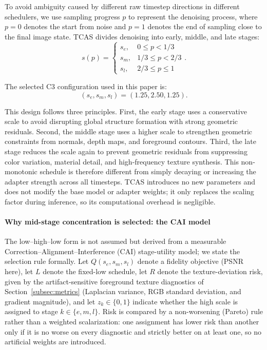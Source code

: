 \documentclass[times,twocolumn,final]{elsarticle}
\begin{document}
To avoid ambiguity caused by different raw timestep directions in different schedulers, we use sampling progress $p$ to represent the denoising process, where $p = 0$ denotes the start from noise and $p = 1$ denotes the end of sampling close to the final image state. TCAS divides denoising into early, middle, and late stages:
\begin{equation}
s(p) = \begin{cases} s_e, & 0 \leq p < 1/3 \\ s_m, & 1/3 \leq p < 2/3 \\ s_l, & 2/3 \leq p \leq 1 \end{cases}.
\label{eq:tcas}
\end{equation}

The selected C3 configuration used in this paper is:
\begin{equation}
(s_e, s_m, s_l) = (1.25, 2.50, 1.25).
\end{equation}

This design follows three principles. First, the early stage uses a conservative scale to avoid disrupting global structure formation with strong geometric residuals. Second, the middle stage uses a higher scale to strengthen geometric constraints from normals, depth maps, and foreground contours. Third, the late stage reduces the scale again to prevent geometric residuals from suppressing color variation, material detail, and high-frequency texture synthesis. This non-monotonic schedule is therefore different from simply decaying or increasing the adapter strength across all timesteps. TCAS introduces no new parameters and does not modify the base model or adapter weights; it only replaces the scaling factor during inference, so its computational overhead is negligible.

\paragraph{Why mid-stage concentration is selected: the CAI model}
The low--high--low form is not assumed but derived from a measurable Correction--Alignment--Interference (CAI) stage-utility model; we state the selection rule formally. Let $Q(s_e,s_m,s_l)$ denote a fidelity objective (PSNR here), let $L$ denote the fixed-low schedule, let $R$ denote the texture-deviation risk, given by the artifact-sensitive foreground texture diagnostics of Section~\ref{subsec:metrics} (Laplacian variance, RGB standard deviation, and gradient magnitude), and let $z_k\in\{0,1\}$ indicate whether the high scale is assigned to stage $k\in\{e,m,l\}$. Risk is compared by a non-worsening (Pareto) rule rather than a weighted scalarization: one assignment has lower risk than another only if it is no worse on every diagnostic and strictly better on at least one, so no artificial weights are introduced.
\end{document}
